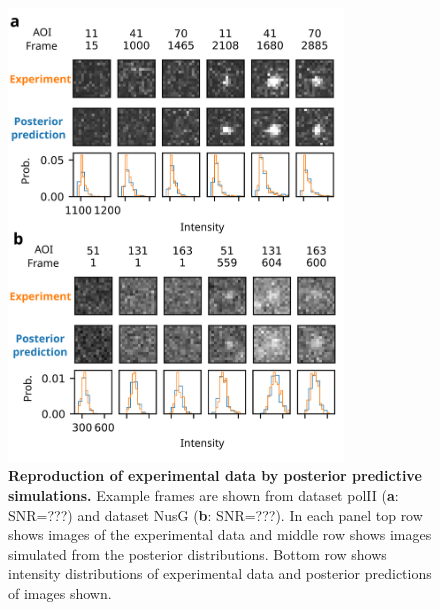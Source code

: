 \begin{figure}[t]
\centering
\includegraphics[width=89mm]{figures/figure4/figure4.png}
\caption{\textbf{Reproduction of experimental data by posterior predictive simulations.} Example frames are shown from dataset polII (\textbf{a}: SNR=???) and dataset NusG (\textbf{b}: SNR=???). In each panel top row shows images of the experimental data and middle row shows images simulated from the posterior distributions. Bottom row shows intensity distributions of experimental data and posterior predictions of images shown. }
\label{fig:posterior_samples}
\end{figure}

